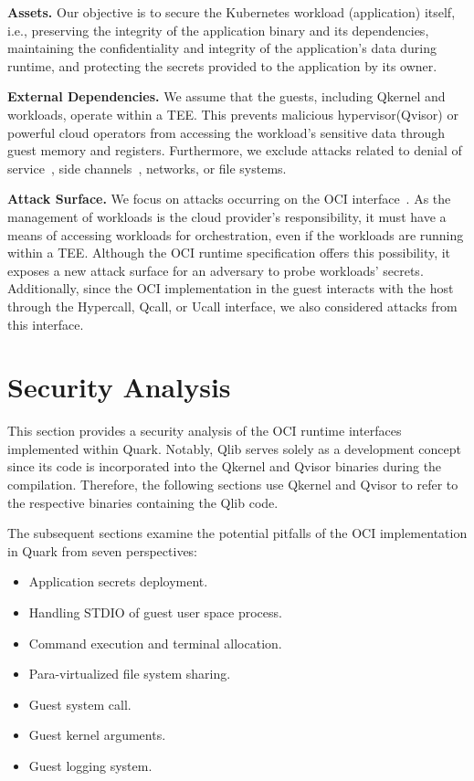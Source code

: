 \textbf{Assets.} Our objective is to secure the Kubernetes workload (application) itself, i.e., preserving the integrity of the application binary and its dependencies, maintaining the confidentiality and integrity of the application's data during runtime, and protecting the secrets provided to the application by its owner.

\textbf{External Dependencies.} We assume that the guests, including Qkernel and workloads, operate within a TEE. This prevents malicious hypervisor(Qvisor) or powerful cloud operators from accessing the workload's sensitive 
data through guest memory and registers. Furthermore, we exclude attacks related to denial of service~\cite*{DOS_ATTACK}, side channels~\cite*{217454}, networks, or file systems.


\textbf{Attack Surface.} We focus on attacks occurring on the OCI interface~\cite*{oci-runtime-spec}. As the management of workloads is the cloud provider's responsibility, it must have a means of accessing workloads for orchestration, even if the 
workloads are running within a TEE. Although the OCI runtime specification offers this possibility, it exposes a new attack surface for an adversary to probe workloads' secrets. Additionally, since the OCI  implementation in the guest interacts with 
the host through the Hypercall, Qcall, or Ucall interface, we also considered attacks from this interface.


\section{Security Analysis}
\label{sec:security_analysis}
This section provides a security analysis of the OCI runtime interfaces~\cite*{oci-runtime-spec} implemented within Quark. Notably, Qlib serves solely as a development concept since its code is incorporated into the Qkernel and Qvisor binaries 
during the compilation. Therefore, the following sections use Qkernel and Qvisor to refer to the respective binaries containing the Qlib code.

The subsequent sections examine the potential pitfalls of the OCI implementation in Quark from seven perspectives:

\begin{itemize}
  \item Application secrets deployment.
  \item Handling STDIO of guest user space process.
  \item Command execution and terminal allocation.
  \item Para-virtualized file system sharing.
  \item Guest system call.
  \item Guest kernel arguments.
  \item Guest logging system. 
\end{itemize}

